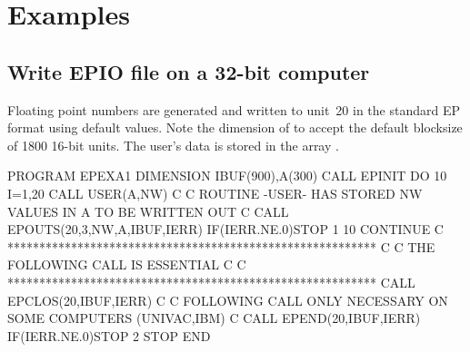  
\chapter{Examples}
\label{sec:H1Examples}

\section{Write EPIO file on a 32-bit computer}
\label{sec:write32bit}

Floating point numbers are generated and written to unit~20
in the standard EP format using default values.
Note the dimension of  to accept the default blocksize
of 1800 16-bit units. 
The user's data is stored in the array .

\begin{XMP}
      PROGRAM EPEXA1
      DIMENSION IBUF(900),A(300)
      CALL EPINIT
      DO 10  I=1,20
      CALL USER(A,NW)
 C
 C   ROUTINE -USER- HAS STORED NW VALUES IN A TO BE WRITTEN OUT
 C
      CALL EPOUTS(20,3,NW,A,IBUF,IERR)
      IF(IERR.NE.0)STOP 1
   10 CONTINUE
 C **********************************************************
 C
 C                THE FOLLOWING CALL IS ESSENTIAL
 C
 C **********************************************************
      CALL EPCLOS(20,IBUF,IERR)
 C
 C   FOLLOWING CALL ONLY NECESSARY ON SOME COMPUTERS (UNIVAC,IBM)
 C
      CALL EPEND(20,IBUF,IERR)
      IF(IERR.NE.0)STOP 2
      STOP
      END
\end{XMP}

\newpage

